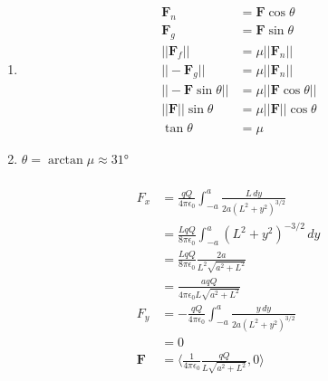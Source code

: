 \documentclass{article}
\begin{document}
\setcounter{subsubsection}{44}
\subsubsection{}

\begin{enumerate}
  \item

        \begin{align*}
          \mathbf{F}_n                & = \mathbf{F} \cos \theta         \\
          \mathbf{F}_g                & = \mathbf{F} \sin \theta         \\
          ||\mathbf{F}_f||            & = \mu ||\mathbf{F}_n||           \\
          ||-\mathbf{F}_g||           & = \mu ||\mathbf{F}_n||           \\
          ||-\mathbf{F} \sin \theta|| & = \mu ||\mathbf{F} \cos \theta|| \\
          ||\mathbf{F}|| \sin \theta  & = \mu ||\mathbf{F}|| \cos \theta \\
          \tan \theta                 & = \mu
        \end{align*}

  \item $\theta = \arctan \mu \approx \ang{31}$
\end{enumerate}

\setcounter{subsubsection}{46}
\subsubsection{}

\begin{align*}
  F_x        & = \frac{q Q}{4 \pi \epsilon_0} \int_{-a}^a \frac{L \,dy}{2 a (L^2 + y^2)^{3 / 2}}  \\
             & = \frac{L q Q}{8 \pi \epsilon_0} \int_{-a}^a (L^2 + y^2)^{-3 / 2} \,dy             \\
             & = \frac{L q Q}{8 \pi \epsilon_0} \frac{2 a}{L^2 \sqrt{a^2 + L^2}}                  \\
             & = \frac{a q Q}{4 \pi \epsilon_0 L \sqrt{a^2 + L^2}}                                \\
  F_y        & = -\frac{q Q}{4 \pi \epsilon_0} \int_{-a}^a \frac{y \,dy}{2 a (L^2 + y^2)^{3 / 2}} \\
             & = 0                                                                                \\
  \mathbf{F} & = \langle \frac{1}{4 \pi \epsilon_0} \frac{q Q}{L \sqrt{a^2 + L^2}}, 0 \rangle
\end{align*}
\end{document}
